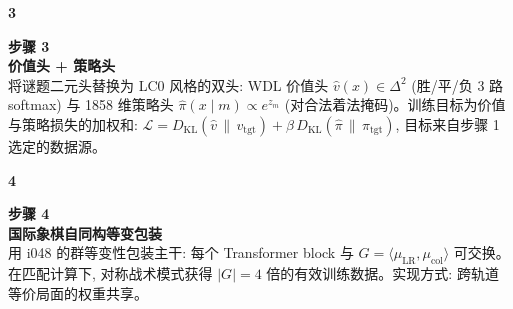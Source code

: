 \documentclass[10pt,a4paper]{article}
\begin{document}
\begin{minipage}{\linewidth}
\begin{minipage}[t]{0.06\linewidth}
\selectfont\LARGE\bfseries\color{forest}3
\end{minipage}\hfill
\begin{minipage}[t]{0.93\linewidth}
\textcolor{muted}{\scriptsize\sffamily\bfseries 步骤 3}\\[0pt]
\textcolor{deepforest}{\sffamily\normalsize\bfseries 价值头 + 策略头}\\[2pt]
将谜题二元头替换为 LC0 风格的双头: WDL 价值头 $\hat{v}(x)\in\Delta^2$ (胜/平/负 3 路 softmax) 与 1858 维策略头 $\hat{\pi}(x\mid m)\propto e^{z_m}$ (对合法着法掩码)。训练目标为价值与策略损失的加权和: $\mathcal{L} = D_{\mathrm{KL}}(\hat{v}\,\|\,v_{\mathrm{tgt}}) + \beta\,D_{\mathrm{KL}}(\hat{\pi}\,\|\,\pi_{\mathrm{tgt}})$, 目标来自步骤 1 选定的数据源。
\end{minipage}
\end{minipage}\par
\vspace{2pt}{\color{linecolor}\rule{\linewidth}{0.3pt}}\vspace{2pt}\par
\begin{minipage}{\linewidth}
\begin{minipage}[t]{0.06\linewidth}
\selectfont\LARGE\bfseries\color{forest}4
\end{minipage}\hfill
\begin{minipage}[t]{0.93\linewidth}
\textcolor{muted}{\scriptsize\sffamily\bfseries 步骤 4}\\[0pt]
\textcolor{deepforest}{\sffamily\normalsize\bfseries 国际象棋自同构等变包装}\\[2pt]
用 i048 的群等变性包装主干: 每个 Transformer block 与 $G = \langle\mu_{\mathrm{LR}}, \mu_{\mathrm{col}}\rangle$ 可交换。在匹配计算下, 对称战术模式获得 $|G| = 4$ 倍的有效训练数据。实现方式: 跨轨道等价局面的权重共享。
\end{minipage}
\end{minipage}\par
\vspace{2pt}{\color{linecolor}\rule{\linewidth}{0.3pt}}\vspace{2pt}\par
\end{document}
